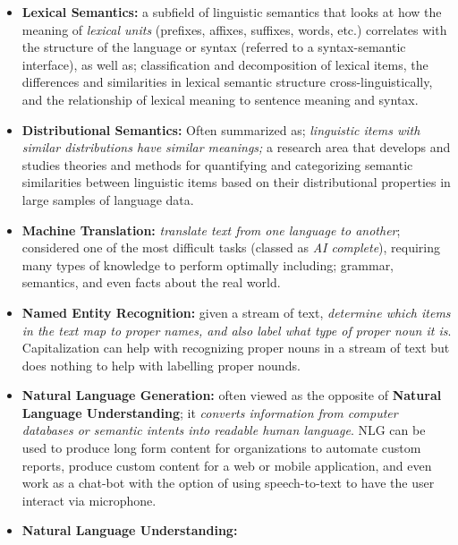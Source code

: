 \documentclass{article}
\newcounter{subsubsubsection}[subsubsection]
\begin{document}
\begin{itemize}
    \item \textbf{Lexical Semantics:} a subfield of linguistic semantics that looks at how the meaning of \textit{lexical units} (prefixes, affixes, suffixes, words, etc.) correlates with the structure of the language or syntax (referred to a syntax-semantic interface), as well as; classification and decomposition of lexical items, the differences and similarities in lexical semantic structure cross-linguistically, and the relationship of lexical meaning to sentence meaning and syntax. \item \textbf{Distributional Semantics:} Often summarized as; \textit{linguistic items with similar distributions have similar meanings;} a research area that develops and studies theories and methods for quantifying and categorizing semantic similarities between linguistic items based on their distributional properties in large samples of language data.
    \item \textbf{Machine Translation:} \textit{translate text from one language to another}; considered one of the most difficult tasks (classed as \textit{AI complete}), requiring many types of knowledge to perform optimally including; grammar, semantics, and even facts about the real world. 
    \item \textbf{Named Entity Recognition:} given a stream of text, \textit{determine which items in the text map to proper names, and also label what type of proper noun it is}. Capitalization can help with recognizing proper nouns in a stream of text but does nothing to help with labelling proper nounds. 
    \item \textbf{Natural Language Generation:} often viewed as the opposite of \textbf{Natural Language Understanding}; it \textit{converts information from computer databases or semantic intents into readable human language}. NLG can be used to produce long form content for organizations to automate custom reports, produce custom content for a web or mobile application, and even work as a chat-bot with the option of using speech-to-text to have the user interact via microphone. 
    \item \textbf{Natural Language Understanding:}
\end{itemize}

\newpage


\newpage 

\end{document}
